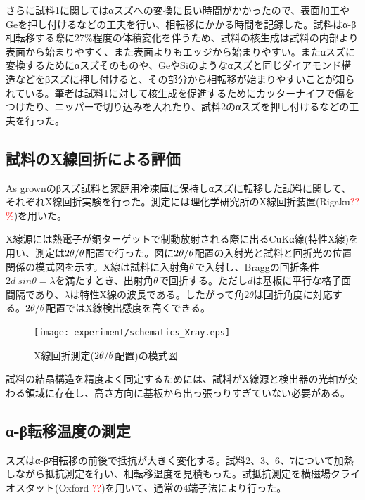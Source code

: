 さらに試料1に関してはαスズへの変換に長い時間がかかったので、表面加工やGeを押し付けるなどの工夫を行い、相転移にかかる時間を記録した。試料はα-β相転移する際に27\%程度の体積変化を伴うため、試料の核生成は試料の内部より表面から始まりやすく、また表面よりもエッジから始まりやすい\cite{Cornelius}。またαスズに変換するためにαスズそのものや、GeやSiのようなαスズと同じダイアモンド構造などをβスズに押し付けると、その部分から相転移が始まりやすいことが知られている\cite{Cornelius}。筆者は試料1に対して核生成を促進するためにカッターナイフで傷をつけたり、ニッパーで切り込みを入れたり、試料2のαスズを押し付けるなどの工夫を行った。

\subsection{試料のX線回折による評価}
\label{sec:Xray_experiment}
As grownのβスズ試料と家庭用冷凍庫に保持しαスズに転移した試料に関して、それぞれX線回折実験を行った。測定には理化学研究所のX線回折装置(Rigaku\textcolor{red}{??\%})を用いた。

X線源には熱電子が銅ターゲットで制動放射される際に出るCuKα線(特性X線)を用い、測定は$\rm 2\theta/\theta$配置で行った。図に$\rm 2\theta/\theta$配置の入射光と試料と回折光の位置関係の模式図を示す。X線は試料に入射角$\rm \theta$で入射し、Braggの回折条件$2d\:sin\theta=\lambda$を満たすとき、出射角$\rm \theta$で回折する。ただし$d$は基板に平行な格子面間隔であり、$\lambda$は特性X線の波長である。したがって角$2\theta$は回折角度に対応する。$\rm 2\theta/\theta$配置ではX線検出感度を高くできる。
\begin{figure}[!h]
    \begin{center}
   \texttt{[image: experiment/schematics\_Xray.eps]}
  \end{center}
  \caption{X線回折測定($\rm 2\theta/\theta$配置)の模式図}
  \label{fig:schematics_Xray}
\end{figure}

試料の結晶構造を精度よく同定するためには、試料がX線源と検出器の光軸が交わる領域に存在し、高さ方向に基板から出っ張っりすぎていない必要がある。


\subsection{α-β転移温度の測定}
スズはα-β相転移の前後で抵抗が大きく変化する。試料2、3、6、7について加熱しながら抵抗測定を行い、相転移温度を見積もった。試抵抗測定を横磁場クライオスタット(Oxford \textcolor{red}{??})を用いて、通常の4端子法により行った。


